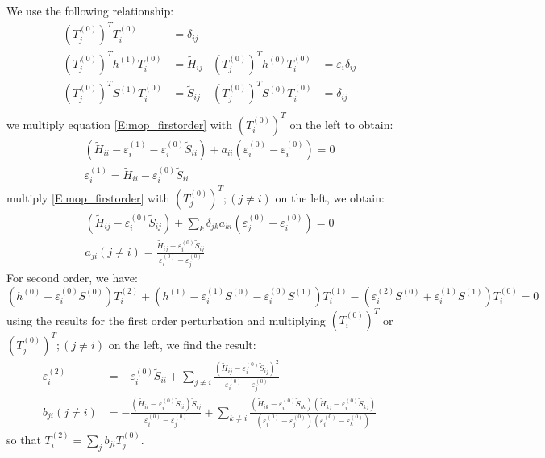 \documentclass{article}
\newcommand{\order}[2]{#1^{(#2)}}
\begin{document}
We use the following relationship:
\begin{align}
    (\order{T_j}{0})^T \order{T_i}{0} &= \delta_{ij}  & &\\ 
    (\order{T_j}{0})^T \order{h}{1} \order{T_i}{0} &= \tilde{H}_{ij} & (\order{T_j}{0})^T \order{h}{0} \order{T_i}{0} &= \varepsilon_i \delta_{ij}\\ 
    (\order{T_j}{0})^T \order{S}{1} \order{T_i}{0} &= \tilde{S}_{ij} & (\order{T_j}{0})^T \order{S}{0} \order{T_i}{0} &= \delta_{ij}\\
\end{align}
we multiply equation \eqref{E:mop_firstorder} with $(\order{T_i}{0})^T$ on the left to obtain:
\begin{gather}
    ( \tilde{H}_{ii} - \order{\varepsilon_i}{1} - \order{\varepsilon_i}{0} \tilde{S}_{ii} ) + a_{ii} (\order{\varepsilon_i}{0} - \order{\varepsilon_i}{0}) = 0 \\ 
    \order{\varepsilon_i}{1} = \tilde{H}_{ii} - \order{\varepsilon_i}{0} \tilde{S}_{ii}
\end{gather}
multiply \eqref{E:mop_firstorder} with $(\order{T_j}{0})^T; (j\neq i)$ on the left, we obtain:
\begin{gather}
    ( \tilde{H}_{ij}- \order{\varepsilon_i}{0} \tilde{S}_{ij} ) + \sum_k \delta_{jk} a_{ki} (\order{\varepsilon_j}{0} - \order{\varepsilon_i}{0}) = 0 \\ 
    a_{ji}(j\neq i) = \frac{\tilde{H}_{ij}- \order{\varepsilon_i}{0} \tilde{S}_{ij}}{\order{\varepsilon_i}{0} - \order{\varepsilon_j}{0}}
\end{gather}
For second order, we have:
\begin{equation}
    (\order{h}{0} - \order{\varepsilon_i}{0}\order{S}{0}) \order{T_i}{2} + (\order{h}{1} - \order{\varepsilon_i}{1} \order{S}{0} - \order{\varepsilon_i}{0} \order{S}{1}) \order{T_i}{1} 
    - (\order{\varepsilon_i}{2} \order{S}{0} + \order{\varepsilon_i}{1} \order{S}{1}) \order{T_i}{0} = 0
\end{equation} 
using the results for the first order perturbation and multiplying $(\order{T_i}{0})^T$ or  $(\order{T_j}{0})^T; (j\neq i)$ on the left, we find the 
result:
\begin{align}
    \order{\varepsilon_i}{2} &= - \order{\varepsilon_i}{0} \tilde{S}_{ii} + \sum_{j\neq i} \frac{(\tilde{H}_{ij}- \order{\varepsilon_i}{0} \tilde{S}_{ij})^2}{\order{\varepsilon_i}{0} - \order{\varepsilon_j}{0}} \\ 
    b_{ji} (j\neq i) &= - \frac{(\tilde{H}_{ii}- \order{\varepsilon_i}{0}\tilde{S}_{ii} )\tilde{S}_{ij}}{\order{\varepsilon_i}{0} - \order{\varepsilon_j}{0}}
    + \sum_{k\neq i} \frac{(\tilde{H}_{ik}- \order{\varepsilon_i}{0} \tilde{S}_{ik})(\tilde{H}_{kj}- \order{\varepsilon_i}{0} \tilde{S}_{kj})}{(\order{\varepsilon_i}{0} - \order{\varepsilon_j}{0})(\order{\varepsilon_i}{0} - \order{\varepsilon_k}{0})}
\end{align}
so that $\order{T_i}{2} = \sum_j b_{ji} \order{T_j}{0}$.
\end{document}
